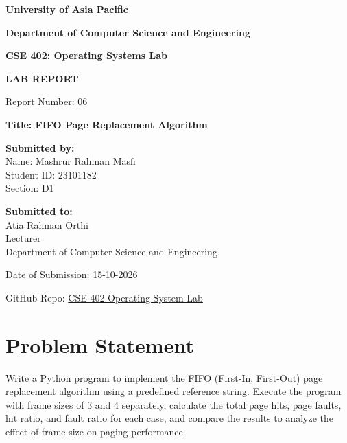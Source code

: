 \documentclass[12pt,a4paper]{article}
\begin{document}
\begin{titlepage}
    \centering
    \vspace*{1cm}
    {\Huge \bfseries University of Asia Pacific \par}
    \vspace{0.5cm}
    {\Large \bfseries Department of Computer Science and Engineering \par}
    \vspace{1.5cm}
    {\huge \bfseries CSE 402: Operating Systems Lab \par}
    \vspace{1cm}
    {\LARGE \bfseries LAB REPORT \par}
    \vspace{0.5cm}
    {\Large Report Number: 06 \par}
    \vspace{1cm}
    {\Large \bfseries Title: FIFO Page Replacement Algorithm \par}
    \vspace{2cm}
    
    \begin{flushleft}
        \large \textbf{Submitted by:} \\
        Name: Mashrur Rahman Masfi \\
        Student ID: 23101182 \\
        Section: D1
    \end{flushleft}
    \vspace{1.5cm}
    
    \begin{flushleft}
        \large \textbf{Submitted to:} \\
        Atia Rahman Orthi \\
        Lecturer \\
        Department of Computer Science and Engineering
    \end{flushleft}
    \vspace{1.5cm}
    
    {\large Date of Submission: 15-10-2026 \par}
    \vfill
    {\large GitHub Repo: \href{https://github.com/MasfiRahman/CSE-402-Operating-System-Lab-.git}{CSE-402-Operating-System-Lab} \par}
\end{titlepage}


\section{Problem Statement}
Write a Python program to implement the FIFO (First-In, First-Out) page replacement algorithm using a predefined reference string. Execute the program with frame sizes of 3 and 4 separately, calculate the total page hits, page faults, hit ratio, and fault ratio for each case, and compare the results to analyze the effect of frame size on paging performance.
\end{document}
